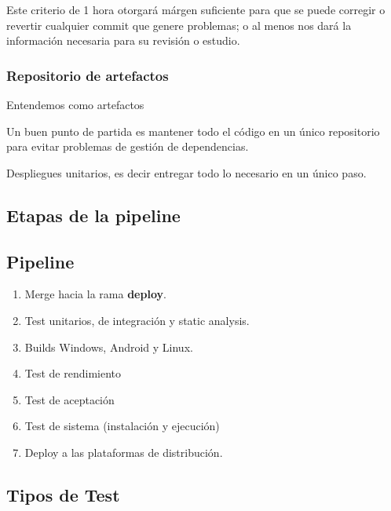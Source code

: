 Este criterio de 1 hora otorgará márgen suficiente para que se puede corregir o
revertir cualquier commit que genere problemas; o al menos nos dará la
información necesaria para su revisión o estudio.

\subsubsection{Repositorio de artefactos}

Entendemos como artefactos

Un buen punto de partida es mantener todo el código en un único repositorio
para evitar problemas de gestión de dependencias.

Despliegues unitarios, es decir entregar todo lo necesario en un único paso.

\subsection{Etapas de la pipeline}




\subsection{Pipeline}

\begin{enumerate}
  \item Merge hacia la rama \textbf{deploy}.
  \item Test unitarios, de integración y static analysis.
  \item Builds Windows, Android y Linux.
  \item Test de rendimiento
  \item Test de aceptación
  \item Test de sistema (instalación y ejecución)
  \item Deploy a las plataformas de distribución.
\end{enumerate}



\subsection{Tipos de Test}\label{pipeline:tipos-de-test}

